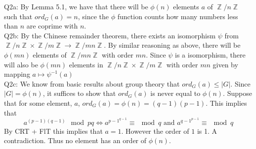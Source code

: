\documentclass[letterpaper]{article}
\DeclareMathOperator{\Z}{\mathbb{Z}}
\begin{document}
\noindent Q2a: By Lemma 5.1, we have that there will be $\phi(n)$ elements $a$ of $\Z / n\Z$ such that $ord_G(a)=n$, since the $\phi $ function counts how many numbers less than $n$ are coprime with $n$. 
\newline \\ Q2b: By the Chinese remainder theorem, there exists an isomorphism $\psi$ from $\Z / n \Z \times \Z / m \Z \to \Z / mn \Z$. By similar reasoning as above, there will be $\phi(mn)$ elements of $\Z / mn \Z$ with order $mn$. Since $\psi$ is a isomorphism, there will also be $\phi(mn)$ elements in $\Z / n \Z \times \Z / m \Z$ with order $mn$ given by mapping $a\mapsto \psi^{-1}(a)$
\newline \\ Q2c: We know from basic results about group theory that $ord_G(a) \leq |G|$. Since $|G |= \phi(n)$, it suffices to show that $ord_G(a)$ is never equal to $\phi(n)$. Suppose that for some element, $a$, $ord_G(a) = \phi(n) = (q-1)(p-1)$. This implies that $$a^{(p-1)(q-1)}\mod{pq} \iff a^{p-1^{q-1}} \equiv \mod{q} \text{ and } a^{q-1^{p-1}}\equiv\mod{q}$$ By CRT + FlT this implies that $a=1$. However the order of $1$ is 1. A contradiction. Thus no element has an order of $\phi(n)$. 
\end{document}
